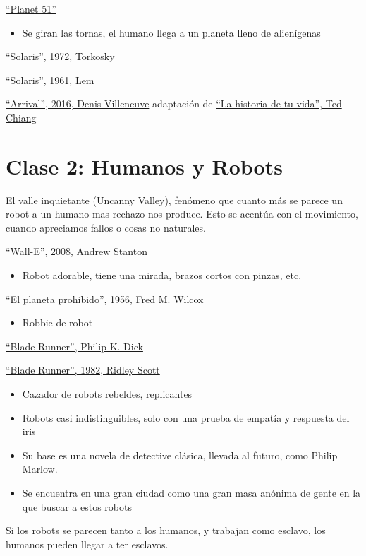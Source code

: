 \documentclass[12pt, twoside, openright]{report} %
\begin{document}
\underline{\enquote{Planet 51}}
\begin{itemize}
	\item Se giran las tornas, el humano llega a un planeta lleno de alienígenas
\end{itemize}

\underline{\enquote{Solaris}, 1972, Torkosky}

\underline{\enquote{Solaris}, 1961, Lem}

\underline{\enquote{Arrival}, 2016, Denis Villeneuve} adaptación de \underline{\enquote{La historia de tu vida}, Ted Chiang}

\chapter{Clase 2: Humanos y Robots}
El valle inquietante (Uncanny Valley), fenómeno que cuanto más se parece un robot a un humano mas rechazo nos produce. Esto se acentúa con el movimiento, cuando apreciamos fallos o cosas no naturales.

\underline{\enquote{Wall-E}, 2008, Andrew Stanton}
\begin{itemize}
	\item Robot adorable, tiene una mirada, brazos cortos con pinzas, etc.
\end{itemize}

\underline{\enquote{El planeta prohibido}, 1956, Fred M. Wilcox}
\begin{itemize}
	\item Robbie de robot
\end{itemize}

\underline{\enquote{Blade Runner}, Philip K. Dick}

\underline{\enquote{Blade Runner}, 1982, Ridley Scott}
\begin{itemize}
	\item Cazador de robots rebeldes, replicantes
	\item Robots casi indistinguibles, solo con una prueba de empatía y respuesta del iris
	\item Su base es una novela de detective clásica, llevada al futuro, como Philip Marlow.
	\item Se encuentra en una gran ciudad como una gran masa anónima de gente en la que buscar a estos robots
\end{itemize}

Si los robots se parecen tanto a los humanos, y trabajan como esclavo, los humanos pueden llegar a ter esclavos.
\end{document}
